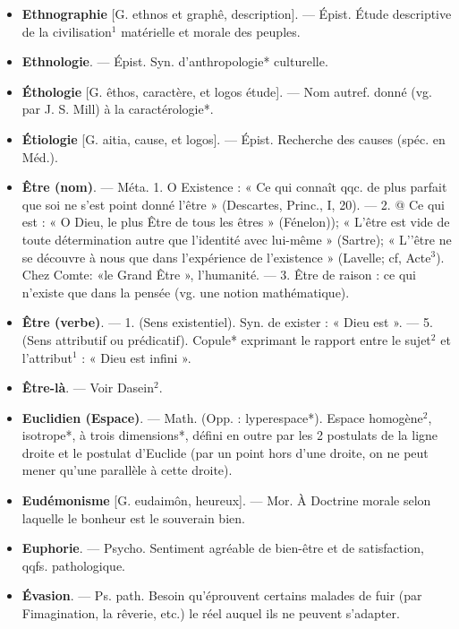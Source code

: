 \begin{itemize}[leftmargin=1cm, label=, itemsep=1pt]
\item {\bf Ethnographie} [G. ethnos et graphê,
description]. — Épist. Étude descriptive de la civilisation$^1$ matérielle et morale des peuples.

\item {\bf Ethnologie}. — Épist. Syn. d'anthropologie* culturelle.

\item {\bf Éthologie} [G. êthos, caractère, et logos
étude]. — Nom autref. donné (vg.
par J. S. Mill) à la caractérologie*.

\item {\bf Étiologie} [G. aitia, cause, et logos]. —
Épist. Recherche des causes (spéc.
en Méd.).

\item {\bf Être (nom)}. — Méta. 1. O Existence :
« Ce qui connaît qqc. de plus parfait
que soi ne s’est point donné l'être »
(Descartes, Princ., I, 20). — 2. @ Ce
qui est : « O Dieu, le plus Être de
tous les êtres » (Fénelon)); « L’être
est vide de toute détermination
autre que l'identité avec lui-même »
(Sartre); « L'’être ne se découvre à
nous que dans l'expérience de l’existence » (Lavelle; cf, Acte$^3$). Chez
Comte: «le Grand Être », l'humanité.
— 3. Être de raison : ce qui n'existe
que dans la pensée (vg. une notion
mathématique).

\item {\bf Être (verbe)}. — 1. (Sens existentiel).
Syn. de exister : « Dieu est ». — 5.
(Sens attributif ou prédicatif). Copule* exprimant le rapport entre le
sujet$^2$ et l'attribut$^1$ : « Dieu est
infini ».

\item {\bf Être-là}. — Voir Dasein$^2$.

\item {\bf Euclidien (Espace)}. — Math. (Opp. :
lyperespace*). Espace homogène$^2$,
isotrope*, à trois dimensions*, défini
en outre par les 2 postulats de la
ligne droite et le postulat d'Euclide
(par un point hors d’une droite, on
ne peut mener qu'une parallèle à
cette droite).

\item {\bf Eudémonisme} [G. eudaimôn, heureux]. — Mor. À Doctrine morale
selon laquelle le bonheur est le souverain bien.

\item {\bf Euphorie}. — Psycho. Sentiment
agréable de bien-être et de satisfaction, qqfs. pathologique.

\item {\bf Évasion}. — Ps. path. Besoin qu’éprouvent certains malades de fuir (par
Fimagination, la rêverie, etc.) le
réel auquel ils ne peuvent s'adapter.


\end{itemize}
